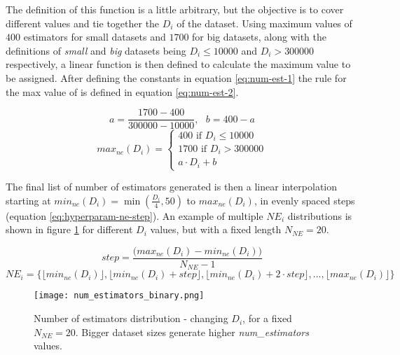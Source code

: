 The definition of this function is a little arbitrary, but the objective is to cover different values and tie together the $D_i$ of the dataset. Using maximum values of $400$ estimators for small datasets and $1700$ for big datasets, along with the definitions of \textit{small} and \textit{big} datasets being $D_i\leq10000$ and $D_i>300000$ respectively, a linear function is then defined to calculate the maximum value to be assigned. After defining the constants in equation \ref{eq:num-est-1} the rule for the max value of  is defined in equation \ref{eq:num-est-2}.

\begin{equation}
    a = \frac{1700 - 400}{300000 - 10000}, \text{ }b = 400 - a
    \label{eq:num-est-1}
\end{equation}
\begin{equation}
    max_{ne}(D_i) = \begin{cases}
        400 \text{ if } D_i \leq 10000 \\
        1700 \text{ if } D_i > 300000 \\
        a \cdot D_i + b
    \end{cases}
    \label{eq:num-est-2}
\end{equation}

The final list of number of estimators generated is then a linear interpolation starting at $min_{ne}(D_i) = \min(\frac{D_i}{4}, 50)$ to $max_{ne}(D_i)$, in evenly spaced steps (equation \ref{eq:hyperparam-ne-step}). An example of multiple $NE_i$ distributions is shown in figure \ref{fig:hyperparam-ne1} for different $D_i$ values, but with a fixed length $N_{NE} = 20$.

$$step = \frac{\Big(max_{ne}(D_i) - min_{ne}(D_i)\Big)}{N_{NE} - 1}$$
\begin{equation}
    NE_i = \Big\{\lfloor min_{ne}(D_i) \rfloor,\lfloor min_{ne}(D_i) + step \rfloor,\lfloor min_{ne}(D_i) + 2\cdot step \rfloor, ... ,\lfloor max_{ne}(D_i)\rfloor\Big\}
    \label{eq:hyperparam-ne-step}
\end{equation}

\begin{figure}[!h]
    \centering
    \texttt{[image: num\_estimators\_binary.png]} 
    \caption{Number of estimators distribution - changing $D_i$, for a fixed $N_{NE} = 20$. Bigger dataset sizes generate higher \textit{num\_estimators} values.}
    \label{fig:hyperparam-ne1}
\end{figure}

\newpage
